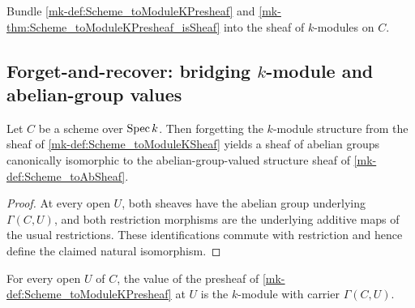 \begin{definition}\label{mk-def:Scheme_toModuleKSheaf}
  \leanok


  Bundle \ref{mk-def:Scheme_toModuleKPresheaf} and \ref{mk-thm:Scheme_toModuleKPresheaf_isSheaf} into the sheaf of \(k\)-modules on \(C\).
\end{definition}

\subsection{Forget-and-recover: bridging \(k\)-module and abelian-group values}

\begin{definition}\label{mk-def:Scheme_toModuleKSheaf_forgetCompare}
  \leanok


  Let \(C\) be a scheme over \(\operatorname{Spec} k\). Then forgetting the \(k\)-module structure from the sheaf of \ref{mk-def:Scheme_toModuleKSheaf} yields a sheaf of abelian groups canonically isomorphic to the abelian-group-valued structure sheaf of \ref{mk-def:Scheme_toAbSheaf}.
\end{definition}

\begin{proof}
  \leanok

  At every open \(U\), both sheaves have the abelian group underlying \(\Gamma(C,U)\), and both restriction morphisms are the underlying additive maps of the usual restrictions. These identifications commute with restriction and hence define the claimed natural isomorphism.
\end{proof}

\begin{lemma}\label{mk-lem:Scheme_toModuleKPresheaf_obj}
  \leanok


  For every open \(U\) of \(C\), the value of the presheaf of \ref{mk-def:Scheme_toModuleKPresheaf} at \(U\) is the \(k\)-module with carrier \(\Gamma(C, U)\).
\end{lemma}

